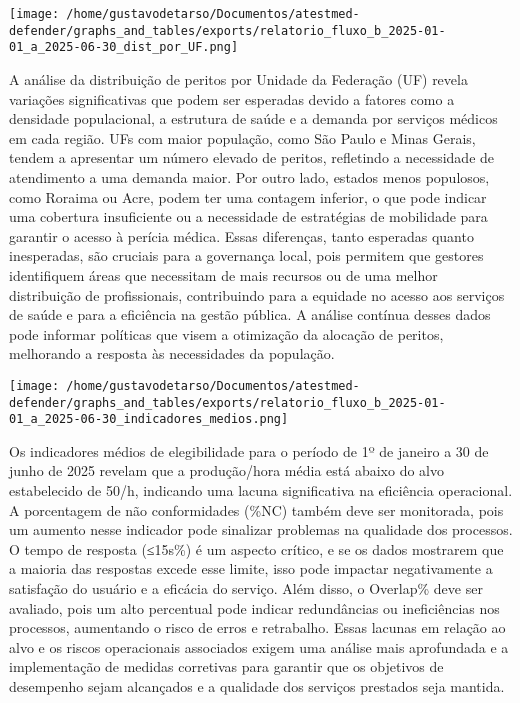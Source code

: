 \documentclass[11pt]{article}
\begin{document}
\begin{center}
\texttt{[image: /home/gustavodetarso/Documentos/atestmed-defender/graphs\_and\_tables/exports/relatorio\_fluxo\_b\_2025-01-01\_a\_2025-06-30\_dist\_por\_UF.png]}
\end{center}
A análise da distribuição de peritos por Unidade da Federação (UF) revela variações significativas que podem ser esperadas devido a fatores como a densidade populacional, a estrutura de saúde e a demanda por serviços médicos em cada região. UFs com maior população, como São Paulo e Minas Gerais, tendem a apresentar um número elevado de peritos, refletindo a necessidade de atendimento a uma demanda maior. Por outro lado, estados menos populosos, como Roraima ou Acre, podem ter uma contagem inferior, o que pode indicar uma cobertura insuficiente ou a necessidade de estratégias de mobilidade para garantir o acesso à perícia médica. Essas diferenças, tanto esperadas quanto inesperadas, são cruciais para a governança local, pois permitem que gestores identifiquem áreas que necessitam de mais recursos ou de uma melhor distribuição de profissionais, contribuindo para a equidade no acesso aos serviços de saúde e para a eficiência na gestão pública. A análise contínua desses dados pode informar políticas que visem a otimização da alocação de peritos, melhorando a resposta às necessidades da população.
\begin{center}
\texttt{[image: /home/gustavodetarso/Documentos/atestmed-defender/graphs\_and\_tables/exports/relatorio\_fluxo\_b\_2025-01-01\_a\_2025-06-30\_indicadores\_medios.png]}
\end{center}
Os indicadores médios de elegibilidade para o período de 1º de janeiro a 30 de junho de 2025 revelam que a produção/hora média está abaixo do alvo estabelecido de 50/h, indicando uma lacuna significativa na eficiência operacional. A porcentagem de não conformidades (\%NC) também deve ser monitorada, pois um aumento nesse indicador pode sinalizar problemas na qualidade dos processos. O tempo de resposta (≤15s\%) é um aspecto crítico, e se os dados mostrarem que a maioria das respostas excede esse limite, isso pode impactar negativamente a satisfação do usuário e a eficácia do serviço. Além disso, o Overlap\% deve ser avaliado, pois um alto percentual pode indicar redundâncias ou ineficiências nos processos, aumentando o risco de erros e retrabalho. Essas lacunas em relação ao alvo e os riscos operacionais associados exigem uma análise mais aprofundada e a implementação de medidas corretivas para garantir que os objetivos de desempenho sejam alcançados e a qualidade dos serviços prestados seja mantida.
\end{document}
